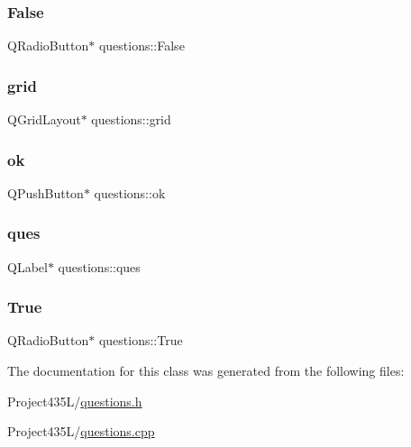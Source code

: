 \subsubsection{\texorpdfstring{False}{False}}
{\footnotesize\ttfamily Q\+Radio\+Button$\ast$ questions\+::\+False\hspace{0.3cm}{\ttfamily [private]}}

\mbox{\label{classquestions_a44173dc43031eb173b3a11de30f3dfb5}} 
\subsubsection{\texorpdfstring{grid}{grid}}
{\footnotesize\ttfamily Q\+Grid\+Layout$\ast$ questions\+::grid\hspace{0.3cm}{\ttfamily [private]}}

\mbox{\label{classquestions_a9b25e47526c1e19510903a49564f5124}} 
\subsubsection{\texorpdfstring{ok}{ok}}
{\footnotesize\ttfamily Q\+Push\+Button$\ast$ questions\+::ok\hspace{0.3cm}{\ttfamily [private]}}

\mbox{\label{classquestions_a06ed2d598a3074500ab9d9a854392aad}} 
\subsubsection{\texorpdfstring{ques}{ques}}
{\footnotesize\ttfamily Q\+Label$\ast$ questions\+::ques\hspace{0.3cm}{\ttfamily [private]}}

\mbox{\label{classquestions_a2a829615b824809fb6b005514027b7e6}} 
\subsubsection{\texorpdfstring{True}{True}}
{\footnotesize\ttfamily Q\+Radio\+Button$\ast$ questions\+::\+True\hspace{0.3cm}{\ttfamily [private]}}



The documentation for this class was generated from the following files\+:\begin{DoxyCompactItemize}
\item 
Project435\+L/\hyperlink{questions_8h}{questions.\+h}\item 
Project435\+L/\hyperlink{questions_8cpp}{questions.\+cpp}\end{DoxyCompactItemize}
